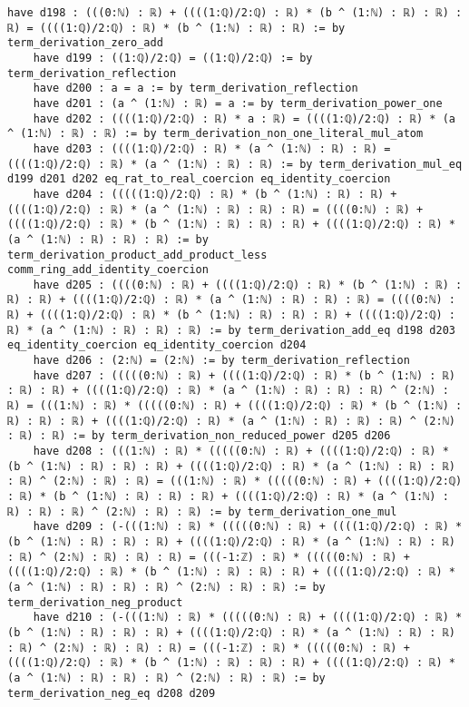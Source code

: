 \documentclass{article}
\begin{document}
\begin{tcolorbox}[colback=white!10, width=\linewidth]
\begin{lstlisting}[language=Lean4]
    have d198 : (((0:ℕ) : ℝ) + ((((1:ℚ)/2:ℚ) : ℝ) * (b ^ (1:ℕ) : ℝ) : ℝ) : ℝ) = ((((1:ℚ)/2:ℚ) : ℝ) * (b ^ (1:ℕ) : ℝ) : ℝ) := by term_derivation_zero_add
    have d199 : ((1:ℚ)/2:ℚ) = ((1:ℚ)/2:ℚ) := by term_derivation_reflection
    have d200 : a = a := by term_derivation_reflection
    have d201 : (a ^ (1:ℕ) : ℝ) = a := by term_derivation_power_one
    have d202 : ((((1:ℚ)/2:ℚ) : ℝ) * a : ℝ) = ((((1:ℚ)/2:ℚ) : ℝ) * (a ^ (1:ℕ) : ℝ) : ℝ) := by term_derivation_non_one_literal_mul_atom
    have d203 : ((((1:ℚ)/2:ℚ) : ℝ) * (a ^ (1:ℕ) : ℝ) : ℝ) = ((((1:ℚ)/2:ℚ) : ℝ) * (a ^ (1:ℕ) : ℝ) : ℝ) := by term_derivation_mul_eq d199 d201 d202 eq_rat_to_real_coercion eq_identity_coercion
    have d204 : (((((1:ℚ)/2:ℚ) : ℝ) * (b ^ (1:ℕ) : ℝ) : ℝ) + ((((1:ℚ)/2:ℚ) : ℝ) * (a ^ (1:ℕ) : ℝ) : ℝ) : ℝ) = ((((0:ℕ) : ℝ) + ((((1:ℚ)/2:ℚ) : ℝ) * (b ^ (1:ℕ) : ℝ) : ℝ) : ℝ) + ((((1:ℚ)/2:ℚ) : ℝ) * (a ^ (1:ℕ) : ℝ) : ℝ) : ℝ) := by term_derivation_product_add_product_less comm_ring_add_identity_coercion
    have d205 : ((((0:ℕ) : ℝ) + ((((1:ℚ)/2:ℚ) : ℝ) * (b ^ (1:ℕ) : ℝ) : ℝ) : ℝ) + ((((1:ℚ)/2:ℚ) : ℝ) * (a ^ (1:ℕ) : ℝ) : ℝ) : ℝ) = ((((0:ℕ) : ℝ) + ((((1:ℚ)/2:ℚ) : ℝ) * (b ^ (1:ℕ) : ℝ) : ℝ) : ℝ) + ((((1:ℚ)/2:ℚ) : ℝ) * (a ^ (1:ℕ) : ℝ) : ℝ) : ℝ) := by term_derivation_add_eq d198 d203 eq_identity_coercion eq_identity_coercion d204
    have d206 : (2:ℕ) = (2:ℕ) := by term_derivation_reflection
    have d207 : (((((0:ℕ) : ℝ) + ((((1:ℚ)/2:ℚ) : ℝ) * (b ^ (1:ℕ) : ℝ) : ℝ) : ℝ) + ((((1:ℚ)/2:ℚ) : ℝ) * (a ^ (1:ℕ) : ℝ) : ℝ) : ℝ) ^ (2:ℕ) : ℝ) = (((1:ℕ) : ℝ) * (((((0:ℕ) : ℝ) + ((((1:ℚ)/2:ℚ) : ℝ) * (b ^ (1:ℕ) : ℝ) : ℝ) : ℝ) + ((((1:ℚ)/2:ℚ) : ℝ) * (a ^ (1:ℕ) : ℝ) : ℝ) : ℝ) ^ (2:ℕ) : ℝ) : ℝ) := by term_derivation_non_reduced_power d205 d206
    have d208 : (((1:ℕ) : ℝ) * (((((0:ℕ) : ℝ) + ((((1:ℚ)/2:ℚ) : ℝ) * (b ^ (1:ℕ) : ℝ) : ℝ) : ℝ) + ((((1:ℚ)/2:ℚ) : ℝ) * (a ^ (1:ℕ) : ℝ) : ℝ) : ℝ) ^ (2:ℕ) : ℝ) : ℝ) = (((1:ℕ) : ℝ) * (((((0:ℕ) : ℝ) + ((((1:ℚ)/2:ℚ) : ℝ) * (b ^ (1:ℕ) : ℝ) : ℝ) : ℝ) + ((((1:ℚ)/2:ℚ) : ℝ) * (a ^ (1:ℕ) : ℝ) : ℝ) : ℝ) ^ (2:ℕ) : ℝ) : ℝ) := by term_derivation_one_mul
    have d209 : (-(((1:ℕ) : ℝ) * (((((0:ℕ) : ℝ) + ((((1:ℚ)/2:ℚ) : ℝ) * (b ^ (1:ℕ) : ℝ) : ℝ) : ℝ) + ((((1:ℚ)/2:ℚ) : ℝ) * (a ^ (1:ℕ) : ℝ) : ℝ) : ℝ) ^ (2:ℕ) : ℝ) : ℝ) : ℝ) = (((-1:ℤ) : ℝ) * (((((0:ℕ) : ℝ) + ((((1:ℚ)/2:ℚ) : ℝ) * (b ^ (1:ℕ) : ℝ) : ℝ) : ℝ) + ((((1:ℚ)/2:ℚ) : ℝ) * (a ^ (1:ℕ) : ℝ) : ℝ) : ℝ) ^ (2:ℕ) : ℝ) : ℝ) := by term_derivation_neg_product
    have d210 : (-(((1:ℕ) : ℝ) * (((((0:ℕ) : ℝ) + ((((1:ℚ)/2:ℚ) : ℝ) * (b ^ (1:ℕ) : ℝ) : ℝ) : ℝ) + ((((1:ℚ)/2:ℚ) : ℝ) * (a ^ (1:ℕ) : ℝ) : ℝ) : ℝ) ^ (2:ℕ) : ℝ) : ℝ) : ℝ) = (((-1:ℤ) : ℝ) * (((((0:ℕ) : ℝ) + ((((1:ℚ)/2:ℚ) : ℝ) * (b ^ (1:ℕ) : ℝ) : ℝ) : ℝ) + ((((1:ℚ)/2:ℚ) : ℝ) * (a ^ (1:ℕ) : ℝ) : ℝ) : ℝ) ^ (2:ℕ) : ℝ) : ℝ) := by term_derivation_neg_eq d208 d209

\end{lstlisting}
\end{tcolorbox}
\end{document}
